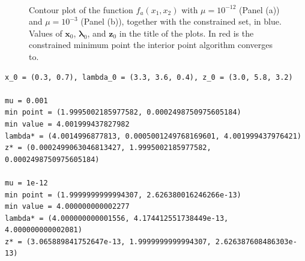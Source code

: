 \documentclass[a4paper,11pt]{article}
\begin{document}
\begin{figure}[H]
	\centering
	 \
	\caption{Contour plot of the function $f_{a}(x_{1},x_{2})$ with $\mu=10^{-12}$ (Panel (a)) and $\mu=10^{-3}$ (Panel (b)), together with the constrained set, in blue. Values of $\textbf{x}_{0}$, $\boldsymbol{\lambda}_{0}$, and $\textbf{z}_{0}$ in the title of the plots. In red is the constrained minimum point the interior point algorithm converges to.}
	\label{Fig:func_a_diff_mu}
\end{figure}


\begin{verbatim}
x_0 = (0.3, 0.7), lambda_0 = (3.3, 3.6, 0.4), z_0 = (3.0, 5.8, 3.2)

mu = 0.001
min point = (1.9995002185977582, 0.0002498750975605184)
min value = 4.001999437827982
lambda* = (4.0014996877813, 0.0005001249768169601, 4.001999437976421)
z* = (0.0002499063046813427, 1.9995002185977582, 0.0002498750975605184)

mu = 1e-12
min point = (1.9999999999994307, 2.626380016246266e-13)
min value = 4.000000000002277
lambda* = (4.000000000001556, 4.174412551738449e-13, 4.000000000002081)
z* = (3.065889841752647e-13, 1.9999999999994307, 2.626387608486303e-13)
\end{verbatim}
\end{document}
